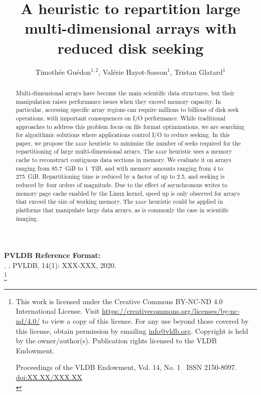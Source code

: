 \documentclass[sigconf, nonacm]{acmart}
\newcommand\vldbdoi{XX.XX/XXX.XX}
\newcommand\vldbpages{XXX-XXX}
\newcommand\vldbvolume{14}
\newcommand\vldbissue{1}
\newcommand\vldbyear{2020}
\newcommand\vldbauthors{\authors}
\newcommand\vldbtitle{\shorttitle}
\newcommand\vldbpagestyle{plain}
\newcommand{\keep}[0]{\textsc{keep}\xspace}
\begin{document}
\title{A heuristic to repartition large multi-dimensional arrays with reduced disk seeking}

\author{Timoth\'ee Gu\'edon$^{1,2}$, Val\'erie Hayot-Sasson$^1$, Tristan Glatard$^1$}


\begin{abstract}
Multi-dimensional arrays have become the main scientific data structures,
but their manipulation raises performance issues when they exceed memory
capacity. In particular, accessing specific array regions can require
millions to billions of disk seek operations, with important consequences
on I/O performance. While traditional approaches to address this problem
focus on file format optimizations, we are searching for algorithmic
solutions where applications control I/O to reduce
seeking. In this paper, we propose the \keep heuristic to minimize the
number of seeks required for the repartitioning of large multi-dimensional
arrays. The \keep heuristic uses a memory cache to reconstruct contiguous
data sections in memory. We evaluate it on arrays ranging from 85.7~GiB to
1~TiB, and with memory amounts ranging from 4 to 275~GiB. Repartitioning
time is reduced by a factor of up to 2.5, and seeking is reduced by four orders
of magnitude. Due to the effect of asynchronous writes to memory page cache
enabled by the Linux kernel, speed up is only observed for arrays that
exceed the size of working memory. The \keep heuristic could be applied in
platforms that manipulate large data arrays, as is commonly the case in
scientific imaging.
\end{abstract}

\maketitle

\pagestyle{\vldbpagestyle}
\begingroup\small\noindent\raggedright\textbf{PVLDB Reference Format:}\\
\vldbauthors. \vldbtitle. PVLDB, \vldbvolume(\vldbissue): \vldbpages, \vldbyear.\\
\endgroup
\begingroup
\renewcommand\thefootnote{}\footnote{\noindent
This work is licensed under the Creative Commons BY-NC-ND 4.0 International License. Visit \url{https://creativecommons.org/licenses/by-nc-nd/4.0/} to view a copy of this license. For any use beyond those covered by this license, obtain permission by emailing \href{mailto:info@vldb.org}{info@vldb.org}. Copyright is held by the owner/author(s). Publication rights licensed to the VLDB Endowment. \\
\raggedright Proceedings of the VLDB Endowment, Vol. \vldbvolume, No. \vldbissue\ %
ISSN 2150-8097. \\
\href{https://doi.org/\vldbdoi}{doi:\vldbdoi} \\
}\addtocounter{footnote}{-1}\endgroup
\end{document}
